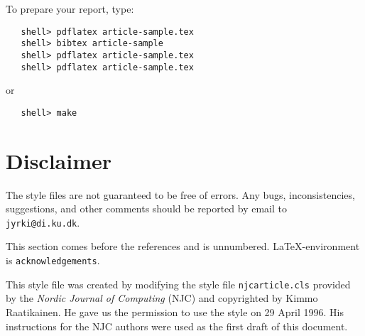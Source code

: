 \documentclass{DIKU-article}[2006/05/09]
\begin{document}
\noindent
To prepare your report, type:
\begin{verbatim}
   shell> pdflatex article-sample.tex
   shell> bibtex article-sample
   shell> pdflatex article-sample.tex
   shell> pdflatex article-sample.tex
\end{verbatim}
or
\begin{verbatim}
   shell> make
\end{verbatim}
 
\section{Disclaimer}

The style files are not guaranteed to be free of errors.  Any bugs,
inconsistencies, suggestions, and other comments should be reported by
email to \texttt{jyrki@di.ku.dk}.

\begin{acknowledgements}

This section comes before the references and is unnumbered.
\LaTeX-en\-viron\-ment is \verb|acknowledgements|.

This style file was created by modifying the style file
\texttt{njcarticle.cls} provided by the \textit{Nordic Journal of
  Computing} (NJC) and copyrighted by Kimmo Raatikainen. He gave us
the permission to use the style on 29 April 1996. His instructions for
the NJC authors were used as the first draft of this document.
\end{acknowledgements}

\nocite{mowgli-overview,Raatikainen-1994a,Raatikainen-1994b}

\end{document}
